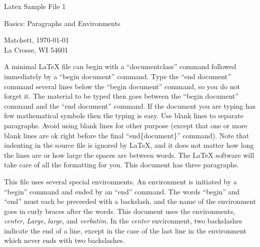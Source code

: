 \documentclass{article}
\begin{document}
   \begin{center}
      \begin{Large}     
                      Latex Sample File 1 \\
      \end{Large}
      \begin{large}
                 Basics:  Paragraphs and Environments \\
      \end{large}
                      Matchett, \today \\
                    La Crosse, WI  54601
   \end{center}
A minimal LaTeX file can begin with a  ``documentclass'' 
command followed immediately by a ``begin document'' command.
Type the ``end document'' command several lines below the
``begin document'' command, so you do not forget it.  The
material to be typed then goes between the ``begin document'' 
command and the ``end document'' command.  If the document you 
are typing has few mathematical symbols then the typing is easy.  
Use blank lines to separate paragraphs.  Avoid using blank lines 
for other purpose (except that one or more blank lines are ok 
right before the final ``end\{document\}'' command).  Note that 
      indenting in the source file is ignored by LaTeX, and it 
does not matter how long the lines  
are or how large       the       spaces are between        words.  
The LaTeX software will take care of all the formatting for you.  
This document has three paragraphs.

This file uses several special environments.  An environment is 
initiated by a ``begin'' command and ended by an ``end'' command.  
The words ``begin'' and ``end'' must each be preceeded with a 
backslash, and the name of the environment goes in curly braces 
after the words.  This document uses the environments, 
\emph{center}, \emph{Large}, \emph{large}, and \emph{verbatim}.  
In the \emph{center} environment, two backslashes indicate the 
end of a line, except in the case of the last line in the 
environment which never ends with two backslashes.
\end{document}
